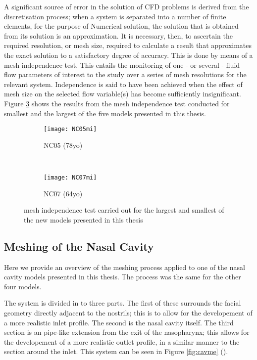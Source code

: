 A significant source of error in the solution of CFD problems is derived from the discretisation process; when a system is separated into a number of finite elements, for the purpose of Numerical solution, the solution that is obtained from its solution is an approximation. It is necessary, then, to ascertain the required resolution, or mesh size, required to calculate a result that approximates the exact solution to a satisfactory degree of accuracy. This is done by means of a mesh independence test. This entails the monitoring of one - or several - fluid flow parameters of interest to the study over a series of mesh resolutions for the relevant system. Independence is said to have been achieved when the effect of mesh size on the selected flow variable(s) has become sufficiently insignificant. Figure \ref{fig:mind} shows the results from the mesh independence test conducted for smallest and the largest of the five models presented in this thesis.

\begin{figure}

  \begin{subfigure}[t]{0.5\textwidth}
    \texttt{[image: NC05mi]}
    \caption{NC05 (78yo)}
    \label{fig:mi5}
  \end{subfigure}%
  ~%
  \begin{subfigure}[t]{0.5\textwidth}
    \texttt{[image: NC07mi]}
    \caption{NC07 (64yo)}
    \label{fig:mi7}
  \end{subfigure}
  \caption{mesh independence test carried out for the largest and smallest of the new models presented in this thesis} \label{fig:mind}

\end{figure} 

\subsection{Meshing of the Nasal Cavity} 

Here we provide an overview of the meshing process applied to one of the nasal cavity models presented in this thesis. The process was the same for the other four models.

The system is divided in to three parts. The first of these surrounds the facial geometry directly adjacent to the nostrils; this is to allow for the developement of a more realistic inlet profile. The second is the nasal cavity itself. The third section is an pipe-like extension from the exit of the nasopharynx; this allows for the developement of a more realistic outlet profile, in a similar manner to the section around the inlet. This system can be seen in Figure \ref{fig:cavme} ().


